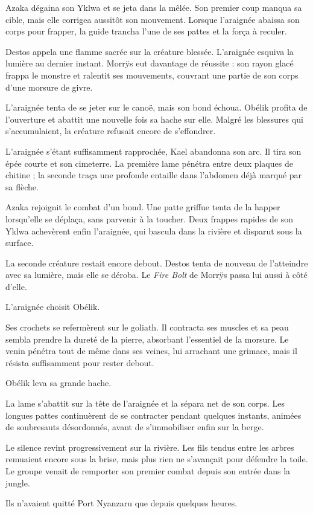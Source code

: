 Azaka dégaina son Yklwa et se jeta dans la mêlée. Son premier coup manqua sa cible, mais elle corrigea aussitôt son mouvement. Lorsque l'araignée abaissa son corps pour frapper, la guide trancha l'une de ses pattes et la força à reculer.

Destos appela une flamme sacrée sur la créature blessée. L'araignée esquiva la lumière au dernier instant. Morrÿs eut davantage de réussite : son rayon glacé frappa le monstre et ralentit ses mouvements, couvrant une partie de son corps d'une morsure de givre.

L'araignée tenta de se jeter sur le canoë, mais son bond échoua. Obélik profita de l'ouverture et abattit une nouvelle fois sa hache sur elle. Malgré les blessures qui s'accumulaient, la créature refusait encore de s'effondrer.

L'araignée s'étant suffisamment rapprochée, Kael abandonna son arc. Il tira son épée courte et son cimeterre. La première lame pénétra entre deux plaques de chitine ; la seconde traça une profonde entaille dans l'abdomen déjà marqué par sa flèche.

Azaka rejoignit le combat d'un bond. Une patte griffue tenta de la happer lorsqu'elle se déplaça, sans parvenir à la toucher. Deux frappes rapides de son Yklwa achevèrent enfin l'araignée, qui bascula dans la rivière et disparut sous la surface.

La seconde créature restait encore debout. Destos tenta de nouveau de l'atteindre avec sa lumière, mais elle se déroba. Le \textit{Fire Bolt} de Morrÿs passa lui aussi à côté d'elle.

L'araignée choisit Obélik.

Ses crochets se refermèrent sur le goliath. Il contracta ses muscles et sa peau sembla prendre la dureté de la pierre, absorbant l'essentiel de la morsure. Le venin pénétra tout de même dans ses veines, lui arrachant une grimace, mais il résista suffisamment pour rester debout.

Obélik leva sa grande hache.

La lame s'abattit sur la tête de l'araignée et la sépara net de son corps. Les longues pattes continuèrent de se contracter pendant quelques instants, animées de soubresauts désordonnés, avant de s'immobiliser enfin sur la berge.

Le silence revint progressivement sur la rivière. Les fils tendus entre les arbres remuaient encore sous la brise, mais plus rien ne s'avançait pour défendre la toile. Le groupe venait de remporter son premier combat depuis son entrée dans la jungle.

Ils n'avaient quitté Port Nyanzaru que depuis quelques heures.
